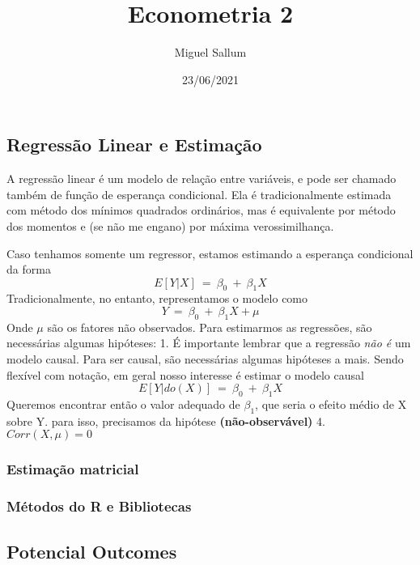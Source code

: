 \documentclass[
]{article}
\title{Econometria 2}
\author{Miguel Sallum}
\date{23/06/2021}
\begin{document}
\maketitle

\hypertarget{regressuxe3o-linear-e-estimauxe7uxe3o}{%
\subsection{Regressão Linear e
Estimação}\label{regressuxe3o-linear-e-estimauxe7uxe3o}}

A regressão linear é um modelo de relação entre variáveis, e pode ser
chamado também de função de esperança condicional. Ela é
tradicionalmente estimada com método dos mínimos quadrados ordinários,
mas é equivalente por método dos momentos e (se não me engano) por
máxima verossimilhança.

Caso tenhamos somente um regressor, estamos estimando a esperança
condicional da forma \[
E[Y|X]\ =\ \beta_0\ +\ \beta_1X
\] Tradicionalmente, no entanto, representamos o modelo como \[
Y\ =\ \beta_0\ +\ \beta_1X +\mu
\] Onde \(\mu\) são os fatores não observados. Para estimarmos as
regressões, são necessárias algumas hipóteses: 1. É importante lembrar
que a regressão \emph{não é} um modelo causal. Para ser causal, são
necessárias algumas hipóteses a mais. Sendo flexível com notação, em
geral nosso interesse é estimar o modelo causal \[
E[Y|do(X)]\ =\ \beta_0\ +\ \beta_1X
\] Queremos encontrar então o valor adequado de \(\beta_1\), que seria o
efeito médio de X sobre Y. para isso, precisamos da hipótese
\textbf{(não-observável)} 4. \(Corr(X,\mu )=0\)

\hypertarget{estimauxe7uxe3o-matricial}{%
\subsubsection{Estimação matricial}\label{estimauxe7uxe3o-matricial}}

\hypertarget{muxe9todos-do-r-e-bibliotecas}{%
\subsubsection{Métodos do R e
Bibliotecas}\label{muxe9todos-do-r-e-bibliotecas}}

\hypertarget{potencial-outcomes}{%
\subsection{Potencial Outcomes}\label{potencial-outcomes}}
\end{document}
